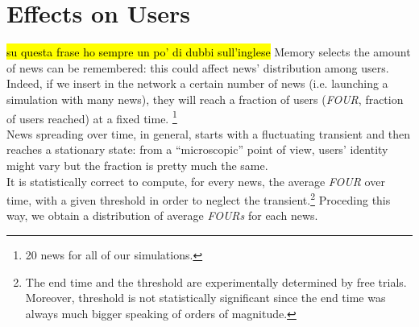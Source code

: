 \section{Effects on Users} \label{sec:users}
\hl{su questa frase ho sempre un po' di dubbi sull'inglese}
Memory selects the amount of news can be remembered: this could
affect news' distribution among users.
Indeed, if we insert in the network a certain number of news
(i.e. launching a simulation with many news), they will reach a
fraction of users (\textit{FOUR}, fraction of users reached)
at a fixed time.
\footnote{20 news for all of our simulations.}\\
News spreading over time, in general, starts with a fluctuating
transient and then reaches a stationary state: from a ``microscopic''
point of view, users' identity might vary but the fraction is
pretty much the same. \\
It is statistically correct to compute, for every news, the average
\textit{FOUR} over time, with a given threshold in order to
neglect the transient.\footnote{The end time and the threshold are
  experimentally determined by free trials. Moreover, threshold is
  not statistically significant since the end time was always much
  bigger speaking of orders of magnitude.}
Proceding this way, we obtain a distribution of average \textit{FOURs}
for each news.\\

